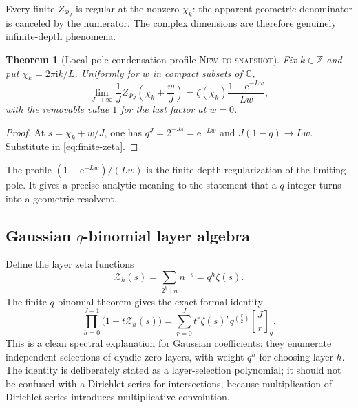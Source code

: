 \documentclass[11pt,oneside]{article}
\numberwithin{equation}{section}
\newtheorem{theorem}{Theorem}[section]
\theoremstyle{definition}
\theoremstyle{remark}
\newcommand{\C}{\mathbb C}
\newcommand{\Z}{\mathbb Z}
\newcommand{\ii}{\mathrm i}
\newcommand{\e}{\mathrm e}
\newcommand{\qbinom}[3]{\genfrac{[}{]}{0pt}{}{#1}{#2}_{#3}}
\newcommand{\NewResult}{\textsc{New-to-snapshot}}
\begin{document}
Every finite $Z_{\Phi_J}$ is regular at the nonzero $\chi_k$: the apparent
geometric denominator is canceled by the numerator.  The complex dimensions are
therefore genuinely infinite-depth phenomena.

\begin{theorem}[Local pole-condensation profile \NewResult]
\label{thm:condensation}
Fix $k\in\Z$ and put $\chi_k=2\pi\ii k/L$.  Uniformly for $w$ in compact subsets
of $\C$,
\begin{equation}
 \lim_{J\to\infty}\frac1J
 Z_{\Phi_J}\!\left(\chi_k+\frac{w}{J}\right)
 =\zeta(\chi_k)\frac{1-\e^{-Lw}}{Lw},                     \label{eq:condensation}
\end{equation}
with the removable value $1$ for the last factor at $w=0$.
\end{theorem}

\begin{proof}
At $s=\chi_k+w/J$, one has
$q^J=2^{-Js}=\e^{-Lw}$ and
$J(1-q)\to Lw$.  Substitute in \eqref{eq:finite-zeta}.
\end{proof}

The profile $(1-\e^{-Lw})/(Lw)$ is the finite-depth regularization of the limiting
pole.  It gives a precise analytic meaning to the statement that a $q$-integer
turns into a geometric resolvent.

\subsection{Gaussian $q$-binomial layer algebra}

Define the layer zeta functions
\begin{equation}
 \mathcal Z_h(s)=\sum_{2^h\mid n}n^{-s}=q^h\zeta(s).        \label{eq:layer-zeta}
\end{equation}
The finite $q$-binomial theorem gives the exact formal identity
\begin{equation}
 \boxed{
 \prod_{h=0}^{J-1}\bigl(1+t\mathcal Z_h(s)\bigr)
 =\sum_{r=0}^{J}t^r\zeta(s)^r q^{\binom r2}
   \qbinom{J}{r}{q}.}                                     \label{eq:q-layer}
\end{equation}
This is a clean spectral explanation for Gaussian coefficients: they enumerate
independent selections of dyadic zero layers, with weight $q^h$ for choosing
layer $h$.  The identity is deliberately stated as a layer-selection polynomial;
it should not be confused with a Dirichlet series for intersections, because
multiplication of Dirichlet series introduces multiplicative convolution.
\end{document}
